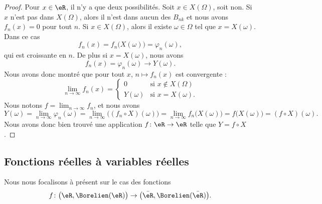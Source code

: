 \begin{proof}
	Pour \( x\in \eR\), il n'y a que deux possibilités. Soit \( x\in X(\Omega)\), soit non. Si \( x\) n'est pas dans \( X(\Omega)\), alors il n'est dans aucun des \( B_{nk}\) et nous avons \( f_n(x)=0\) pour tout \( n\). Si \( x\in X(\Omega)\), alors il existe \( \omega\in \Omega\) tel que \( x=X(\omega)\). Dans ce cas
	\begin{equation}
		f_n(x)=f_n\big( X(\omega) \big)=\varphi_n(\omega),
	\end{equation}
	qui est croissante en \( n\). De plus si \( x= X(\omega)\), nous avons
	\begin{equation}
		f_n(x)=\varphi_n(\omega)\to Y(\omega).
	\end{equation}
	Nous avons donc montré que pour tout \( x\), \( n\mapsto f_n(x)\) est convergente :
	\begin{equation}
		\lim_{n\to \infty} f_n(x)=\begin{cases}
			0         & \text{si } x\notin X(\Omega) \\
			Y(\omega) & \text{si } x=X(\omega).
		\end{cases}
	\end{equation}
	Nous notons \( f=\lim_{n\to \infty} f_n\), et nous avons
	\begin{equation}
		Y(\omega)=\lim_{n\to \infty} \varphi_n(\omega)=\lim_{n\to \infty} \Big( (f_n\circ X)(\omega) \Big)=\lim_{n\to \infty} f_n\big( X(\omega) \big)=f\big( X(\omega) \big)=(f\circ X)(\omega).
	\end{equation}
	Nous avons donc bien trouvé une application \( f\colon \eR\to \eR\) telle que \( Y=f\circ X\).
\end{proof}

\subsection{Fonctions réelles à variables réelles}

Nous nous focalisons à présent sur le cas des fonctions
\begin{equation}
	f\colon \big( \eR,\Borelien(\eR) \big)\to \big( \bar\eR,\Borelien(\bar \eR) \big).
\end{equation}

